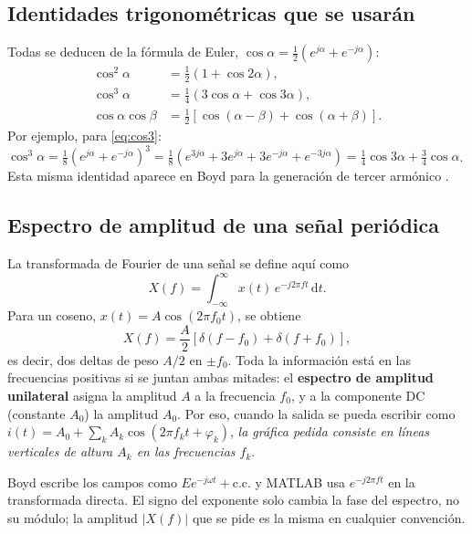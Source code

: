 \documentclass[11pt,letterpaper]{article}
\newcommand{\dd}{\,\mathrm{d}}
\begin{document}
\subsection{Identidades trigonométricas que se usarán}

Todas se deducen de la fórmula de Euler, $\cos\alpha=\tfrac12(e^{j\alpha}+e^{-j\alpha})$:
\begin{align}
  \cos^2\alpha &= \tfrac12\left(1+\cos 2\alpha\right), \label{eq:cos2}\\
  \cos^3\alpha &= \tfrac14\left(3\cos\alpha+\cos 3\alpha\right), \label{eq:cos3}\\
  \cos\alpha\cos\beta &= \tfrac12\left[\cos(\alpha-\beta)+\cos(\alpha+\beta)\right]. \label{eq:prod}
\end{align}
Por ejemplo, para \eqref{eq:cos3}:
$\cos^3\alpha=\tfrac18(e^{j\alpha}+e^{-j\alpha})^3=\tfrac18\left(e^{3j\alpha}+3e^{j\alpha}+3e^{-j\alpha}+e^{-3j\alpha}\right)
=\tfrac14\cos3\alpha+\tfrac34\cos\alpha$. Esta misma identidad aparece en Boyd para la generación de tercer
armónico \cite[ec.~(1.2.13), p.~11]{boyd}.

\subsection{Espectro de amplitud de una señal periódica}

La transformada de Fourier de una señal se define aquí como
\begin{equation}
  X(f)=\int_{-\infty}^{\infty}x(t)\,e^{-j2\pi f t}\dd t .
\end{equation}
Para un coseno, $x(t)=A\cos(2\pi f_0 t)$, se obtiene
\begin{equation}
  X(f)=\frac{A}{2}\left[\delta(f-f_0)+\delta(f+f_0)\right],
\end{equation}
es decir, dos deltas de peso $A/2$ en $\pm f_0$. Toda la información está en las frecuencias positivas
si se juntan ambas mitades: el \textbf{espectro de amplitud unilateral} asigna la amplitud $A$ a la
frecuencia $f_0$, y a la componente DC (constante $A_0$) la amplitud $A_0$. Por eso, cuando la salida se
pueda escribir como $i(t)=A_0+\sum_k A_k\cos(2\pi f_k t+\varphi_k)$, \emph{la gráfica pedida consiste en líneas
verticales de altura $A_k$ en las frecuencias $f_k$}.

\begin{cuidado}
Boyd escribe los campos como $E e^{-j\omega t}+\text{c.c.}$ y MATLAB usa $e^{-j2\pi f t}$ en la transformada
directa. El signo del exponente solo cambia la fase del espectro, no su módulo; la amplitud
$|X(f)|$ que se pide es la misma en cualquier convención.
\end{cuidado}
\end{document}
